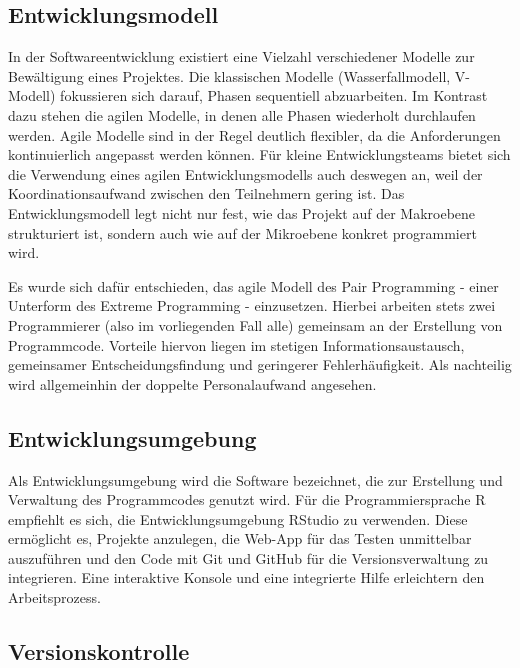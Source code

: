 \documentclass[
]{article}
\begin{document}
\hypertarget{entwicklungsmodell}{%
\subsection{Entwicklungsmodell}\label{entwicklungsmodell}}

In der Softwareentwicklung existiert eine Vielzahl verschiedener Modelle zur Bewältigung eines Projektes. Die klassischen Modelle (Wasserfallmodell, V-Modell) fokussieren sich darauf, Phasen sequentiell abzuarbeiten. Im Kontrast dazu stehen die agilen Modelle, in denen alle Phasen wiederholt durchlaufen werden. Agile Modelle sind in der Regel deutlich flexibler, da die Anforderungen kontinuierlich angepasst werden können. Für kleine Entwicklungsteams bietet sich die Verwendung eines agilen Entwicklungsmodells auch deswegen an, weil der Koordinationsaufwand zwischen den Teilnehmern gering ist. Das Entwicklungsmodell legt nicht nur fest, wie das Projekt auf der Makroebene strukturiert ist, sondern auch wie auf der Mikroebene konkret programmiert wird.

Es wurde sich dafür entschieden, das agile Modell des Pair Programming - einer Unterform des Extreme Programming - einzusetzen. Hierbei arbeiten stets zwei Programmierer (also im vorliegenden Fall alle) gemeinsam an der Erstellung von Programmcode. Vorteile hiervon liegen im stetigen Informationsaustausch, gemeinsamer Entscheidungsfindung und geringerer Fehlerhäufigkeit. Als nachteilig wird allgemeinhin der doppelte Personalaufwand angesehen.

\hypertarget{entwicklungsumgebung}{%
\subsection{Entwicklungsumgebung}\label{entwicklungsumgebung}}

Als Entwicklungsumgebung wird die Software bezeichnet, die zur Erstellung und Verwaltung des Programmcodes genutzt wird. Für die Programmiersprache R empfiehlt es sich, die Entwicklungsumgebung RStudio zu verwenden. Diese ermöglicht es, Projekte anzulegen, die Web-App für das Testen unmittelbar auszuführen und den Code mit Git und GitHub für die Versionsverwaltung zu integrieren. Eine interaktive Konsole und eine integrierte Hilfe erleichtern den Arbeitsprozess.

\hypertarget{versionskontrolle}{%
\subsection{Versionskontrolle}\label{versionskontrolle}}
\end{document}
